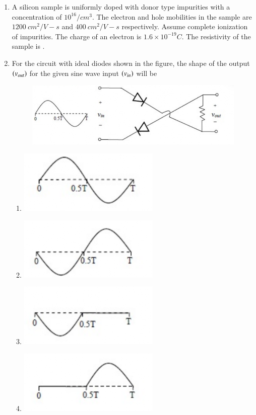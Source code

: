 \documentclass[a4paper, 11pt]{article}
\begin{document}
\begin{enumerate}
    \hfill{}

    \item A silicon sample is uniformly doped with donor type impurities with a concentration of $10^{16}/cm^{3}$. The electron and hole mobilities in the sample are $1200~cm^{2}/V-s$ and $400~cm^{2}/V-s$ respectively. Assume complete ionization of impurities. The charge of an electron is $1.6\times10^{-19}C$. The resistivity of the sample  is \underline{\hspace{2cm}}.
    
    \hfill{}

    \item For the circuit with ideal diodes shown in the figure, the shape of the output $\left(v_{out}\right)$ for the given sine wave input $\left(v_{in}\right)$ will be
    \begin{figure}[H]
        \centering
        \includegraphics[width=0.5\columnwidth]{figs/q21.png}
        \caption*{}
        \label{fig:q21}
    \end{figure}
    \begin{enumerate}
        \item \includegraphics[width=0.4\columnwidth]{figs/q21A.png}
        \item \includegraphics[width=0.4\columnwidth]{figs/q21B.png}
        \item \includegraphics[width=0.4\columnwidth]{figs/q21C.png}
        \item \includegraphics[width=0.4\columnwidth]{figs/q21D.png}
    \end{enumerate}
    

\end{enumerate}
\end{document}
